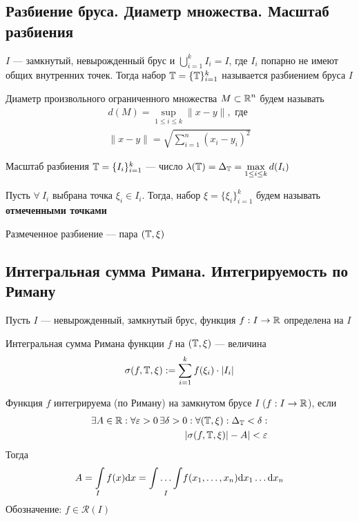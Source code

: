 \documentclass[a4paper, 10pt]{article}
\begin{document}
\subsection{Разбиение бруса. Диаметр множества. Масштаб разбиения}
 \label{1.3} $I$ — замкнутый, невырожденный брус и $\displaystyle\bigcup_{i=1}^kI_i = I$, где $I_i$ попарно не имеют общих внутренних точек. Тогда набор $\operatorname{\mathbb{T}} = \{\operatorname{\mathbb{T}}\}_{i=1}^k$ называется разбиением бруса $I$

 \label{1.4} Диаметр произвольного ограниченного множества $M\subset\operatorname{\mathbb{R}}^n$ будем называть 
\begin{equation*}
\begin{aligned}
    d(M) = \displaystyle\sup_{1\leqslant i\leqslant k}\|x-y\|,\text{ где}\\
    \|x-y\|=\sqrt{\sum_{i=1}^{n}\left(x_i-y_i\right)^2}
\end{aligned}
\end{equation*}

 \label{1.5} Масштаб разбиения $\operatorname{\mathbb{T}}=\{I_i\}_{i=1}^k$ — число $\lambda(\operatorname{\mathbb{T}}) = \Delta_{\operatorname{\mathbb{T}}} = \displaystyle\max_{1\le i\le k} d(I_i)$

 \label{1.6} Пусть $\forall\ I_i$ выбрана точка $\xi_i\in I_i$. Тогда, набор $\xi = \{\xi_i\}_{i=1}^k$ будем называть \textbf{отмеченными точками}

 \label{1.7} Размеченное разбиение — пара $(\operatorname{\mathbb{T}}, \xi)$

\subsection{Интегральная сумма Римана. Интегрируемость по Риману}
Пусть $I$ — невырожденный, замкнутый брус, функция $f: I\rightarrow \operatorname{\mathbb{R}}$ определена на $I$

 \label{1.8} Интегральная сумма Римана функции $f$ на $(\operatorname{\mathbb{T}}, \xi)$ — величина
$$\sigma(f, \T, \xi) := \sum_{i=1}^kf(\xi_i)\cdot|I_i|$$

 \label{1.9} Функция $f$ интегрируема (по Риману) на замкнутом брусе $I$ ($f:I\rightarrow\operatorname{\mathbb{R}}$), если 
\begin{equation*}
\begin{aligned}
    \exists A\in\operatorname{\mathbb{R}}: \forall \varepsilon > 0\, \exists \delta > 0: \forall(\operatorname{\mathbb{T}}, \xi): \Delta_{\operatorname{\mathbb{T}}} < \delta:\\
    |\sigma(f, \operatorname{\mathbb{T}}, \xi)| - A| < \varepsilon
\end{aligned}
\end{equation*}
Тогда 
$$A = \int\limits_If(x)\text{d}x = \underset{I}{\int\ldots\int}f(x_1, \ldots, x_n)\text{d}x_1\ldots \text{d}x_n$$
Обозначение: $f\in\mathcal{R}(I)$
\end{document}

